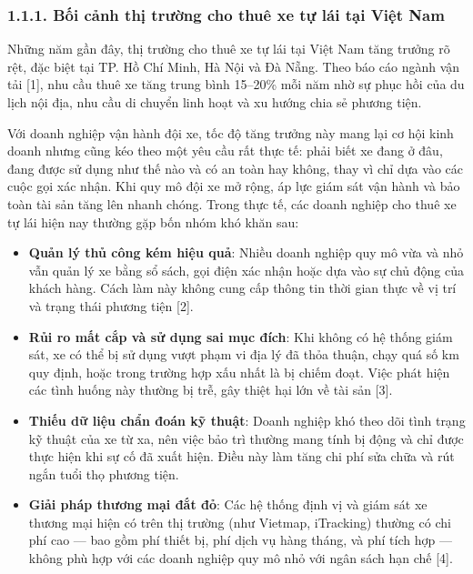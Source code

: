 \documentclass[a4paper]{extarticle}
\providecommand{\tightlist}{%
  \setlength{\itemsep}{0pt}\setlength{\parskip}{0pt}}
\begin{document}
\subsubsection{1.1.1. Bối cảnh thị trường cho thuê xe tự lái tại Việt
Nam}\label{111-bux1ed1i-cux1ea3nh-thux1ecb-trux1b0ux1eddng-cho-thuuxea-xe-tux1ef1-luxe1i-tux1ea1i-viux1ec7t-nam}

Những năm gần đây, thị trường cho thuê xe tự lái tại Việt Nam tăng
trưởng rõ rệt, đặc biệt tại TP. Hồ Chí Minh, Hà Nội và Đà Nẵng. Theo báo
cáo ngành vận tải {[}1{]}, nhu cầu thuê xe tăng trung bình 15--20\% mỗi
năm nhờ sự phục hồi của du lịch nội địa, nhu cầu di chuyển linh hoạt và
xu hướng chia sẻ phương tiện.

Với doanh nghiệp vận hành đội xe, tốc độ tăng trưởng này mang lại cơ hội
kinh doanh nhưng cũng kéo theo một yêu cầu rất thực tế: phải biết xe
đang ở đâu, đang được sử dụng như thế nào và có an toàn hay không, thay
vì chỉ dựa vào các cuộc gọi xác nhận. Khi quy mô đội xe mở rộng, áp lực
giám sát vận hành và bảo toàn tài sản tăng lên nhanh chóng. Trong thực
tế, các doanh nghiệp cho thuê xe tự lái hiện nay thường gặp bốn nhóm khó
khăn sau:

\begin{itemize}
\tightlist
\item
  \textbf{Quản lý thủ công kém hiệu quả}: Nhiều doanh nghiệp quy mô vừa
  và nhỏ vẫn quản lý xe bằng sổ sách, gọi điện xác nhận hoặc dựa vào sự
  chủ động của khách hàng. Cách làm này không cung cấp thông tin thời
  gian thực về vị trí và trạng thái phương tiện {[}2{]}.
\item
  \textbf{Rủi ro mất cắp và sử dụng sai mục đích}: Khi không có hệ thống
  giám sát, xe có thể bị sử dụng vượt phạm vi địa lý đã thỏa thuận, chạy
  quá số km quy định, hoặc trong trường hợp xấu nhất là bị chiếm đoạt.
  Việc phát hiện các tình huống này thường bị trễ, gây thiệt hại lớn về
  tài sản {[}3{]}.
\item
  \textbf{Thiếu dữ liệu chẩn đoán kỹ thuật}: Doanh nghiệp khó theo dõi
  tình trạng kỹ thuật của xe từ xa, nên việc bảo trì thường mang tính bị
  động và chỉ được thực hiện khi sự cố đã xuất hiện. Điều này làm tăng
  chi phí sửa chữa và rút ngắn tuổi thọ phương tiện.
\item
  \textbf{Giải pháp thương mại đắt đỏ}: Các hệ thống định vị và giám sát xe thương
  mại hiện có trên thị trường (như Vietmap, iTracking) thường có chi phí
  cao --- bao gồm phí thiết bị, phí dịch vụ hàng tháng, và phí tích hợp
  --- không phù hợp với các doanh nghiệp quy mô nhỏ với ngân sách hạn
  chế {[}4{]}.
\end{itemize}
\end{document}
